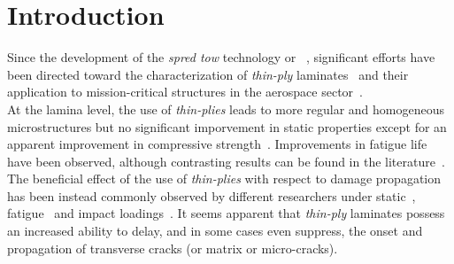 \documentclass[review]{elsarticle}
\begin{document}
\linenumbers


\section{Introduction}

Since the development of the \emph{spred tow} technology or ~\cite{Kawabe2008,Kawabe2008en}, significant efforts have been directed toward the characterization of \emph{thin-ply} laminates~\cite{Sasayama2003,Yamaguchi2005,Tsai2005,Sihn2007,Yokozeki2008,Yokozeki2010,Saito2012,Arteiro2013,Arteiro2014,Amacher2014,Guillamet2014,Huang2018,Cugnoni2018} and their application to mission-critical structures in the aerospace sector~\cite{Moon2011,Kim2017,Kopp2017,McCarville2018}.\\
At the lamina level, the use of \emph{thin-plies} leads to more regular and homogeneous microstructures but no significant imporvement in static properties except for an apparent improvement in compressive strength~\cite{Amacher2014}. Improvements in fatigue life have been observed, although contrasting results can be found in the literature~\cite{Yamaguchi2005,Tsai2005,Sihn2007}. The beneficial effect of the use of \emph{thin-plies} with respect to damage propagation has been instead commonly observed by different researchers under static~\cite{Sasayama2003,Sihn2007,Yokozeki2008,Yokozeki2010,Saito2012,Arteiro2013,Arteiro2014,Amacher2014}, fatigue~\cite{Yamaguchi2005,Sihn2007,Yokozeki2008,Yokozeki2010,Amacher2014} and impact loadings~\cite{Sihn2007,Yokozeki2008,Yokozeki2010,Amacher2014}. It seems apparent that \emph{thin-ply} laminates possess an increased ability to delay, and in some cases even suppress, the onset and propagation of transverse cracks (or matrix or micro-cracks).\\
\end{document}
